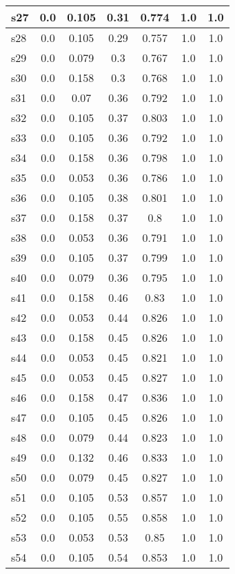 \documentclass{article}
\begin{document}
\begin{tabular}{|l|c|c|c|c|c|c|}
\hline
s27 &0.0 & 0.105 & 0.31 & 0.774 & 1.0 & 1.0\\
\hline
s28 &0.0 & 0.105 & 0.29 & 0.757 & 1.0 & 1.0\\
\hline
s29 &0.0 & 0.079 & 0.3 & 0.767 & 1.0 & 1.0\\
\hline
s30 &0.0 & 0.158 & 0.3 & 0.768 & 1.0 & 1.0\\
\hline
s31 &0.0 & 0.07 & 0.36 & 0.792 & 1.0 & 1.0\\
\hline
s32 &0.0 & 0.105 & 0.37 & 0.803 & 1.0 & 1.0\\
\hline
s33 &0.0 & 0.105 & 0.36 & 0.792 & 1.0 & 1.0\\
\hline
s34 &0.0 & 0.158 & 0.36 & 0.798 & 1.0 & 1.0\\
\hline
s35 &0.0 & 0.053 & 0.36 & 0.786 & 1.0 & 1.0\\
\hline
s36 &0.0 & 0.105 & 0.38 & 0.801 & 1.0 & 1.0\\
\hline
s37 &0.0 & 0.158 & 0.37 & 0.8 & 1.0 & 1.0\\
\hline
s38 &0.0 & 0.053 & 0.36 & 0.791 & 1.0 & 1.0\\
\hline
s39 &0.0 & 0.105 & 0.37 & 0.799 & 1.0 & 1.0\\
\hline
s40 &0.0 & 0.079 & 0.36 & 0.795 & 1.0 & 1.0\\
\hline
s41 &0.0 & 0.158 & 0.46 & 0.83 & 1.0 & 1.0\\
\hline
s42 &0.0 & 0.053 & 0.44 & 0.826 & 1.0 & 1.0\\
\hline
s43 &0.0 & 0.158 & 0.45 & 0.826 & 1.0 & 1.0\\
\hline
s44 &0.0 & 0.053 & 0.45 & 0.821 & 1.0 & 1.0\\
\hline
s45 &0.0 & 0.053 & 0.45 & 0.827 & 1.0 & 1.0\\
\hline
s46 &0.0 & 0.158 & 0.47 & 0.836 & 1.0 & 1.0\\
\hline
s47 &0.0 & 0.105 & 0.45 & 0.826 & 1.0 & 1.0\\
\hline
s48 &0.0 & 0.079 & 0.44 & 0.823 & 1.0 & 1.0\\
\hline
s49 &0.0 & 0.132 & 0.46 & 0.833 & 1.0 & 1.0\\
\hline
s50 &0.0 & 0.079 & 0.45 & 0.827 & 1.0 & 1.0\\
\hline
s51 &0.0 & 0.105 & 0.53 & 0.857 & 1.0 & 1.0\\
\hline
s52 &0.0 & 0.105 & 0.55 & 0.858 & 1.0 & 1.0\\
\hline
s53 &0.0 & 0.053 & 0.53 & 0.85 & 1.0 & 1.0\\
\hline
s54 &0.0 & 0.105 & 0.54 & 0.853 & 1.0 & 1.0\\
\hline

\end{tabular}
\end{document}

